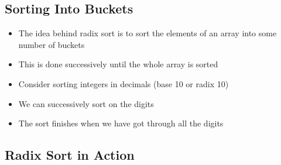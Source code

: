 
\begin{slide}
\section{Sorting Into Buckets}

\begin{PauseHighLight}
  \begin{itemize}
  \item The idea behind radix sort is to sort the elements of an array
    into some number of buckets\pause
  \item This is done successively until the whole array is sorted\pause
  \item Consider sorting integers in decimals (base 10 or radix 10)\pause
  \item We can successively sort on the digits\pause
  \item The sort finishes when we have got through all the digits\pause
  \end{itemize}
\end{PauseHighLight}

\end{slide}


\begin{slide}
\section{Radix Sort in Action}

\pausebuild
\color{TextColor}
\begin{center}
  \pause
\end{center}
\end{slide}


